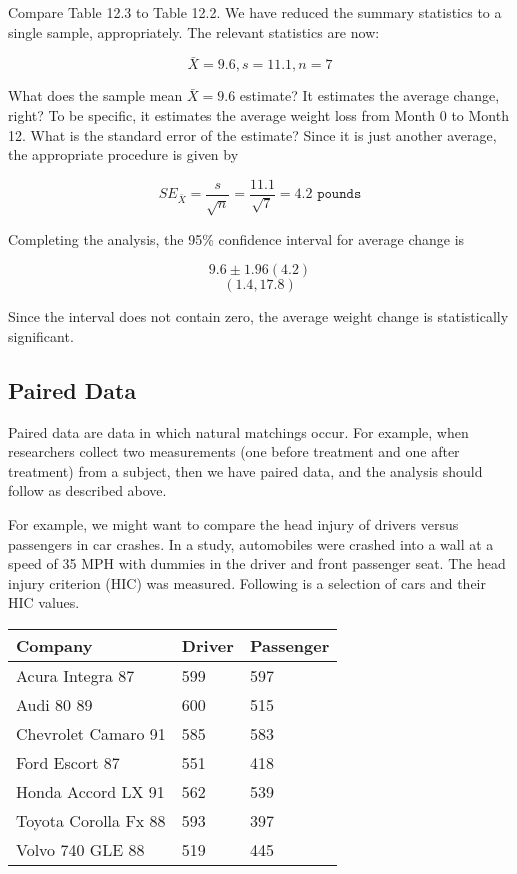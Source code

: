 \documentclass[11pt]{book}\usepackage[]{graphicx}\usepackage[]{color}
\begin{document}
Compare Table 12.3 to Table 12.2.  We have reduced the summary statistics to a single sample, appropriately.  The relevant statistics are now:

$$ \bar{X} = 9.6,  s = 11.1,  n= 7 $$

What does the sample mean $\bar{X} = 9.6$ estimate?  It estimates the average change, right?  To be specific, it estimates the average weight loss from Month 0 to Month 12.  What is the standard error of the estimate?  Since it is just another average, the appropriate procedure is given by 

\begin{equation*}
SE_{\bar{X}} = \frac{s}{\sqrt{n}} = \frac{11.1}{\sqrt{7}} = 4.2 \texttt{ pounds}
\end{equation*}

Completing the analysis, the 95\% confidence interval for average change is

\begin{equation*}
9.6 \pm 1.96 (4.2)
\end{equation*}
\begin{equation*}
(1.4, 17.8)
\end{equation*}

Since the interval does not contain zero, the average weight change is statistically significant.

\subsection{Paired Data}

Paired data are data in which natural matchings occur.  For example, when researchers collect two measurements (one before treatment and one after treatment) from a subject, then we have paired data, and the analysis should follow as described above.  

For example, we might want to compare the head injury of drivers versus passengers in car crashes.   In a study, automobiles were crashed into a wall at a speed of 35 MPH with dummies in the driver and front passenger seat. The head injury criterion (HIC) was measured.  Following is a selection of cars and their HIC values.

\begin{table}[ht]
\centering
\begin{tabular}{@{} lll @{}} \hline
Company & Driver & Passenger \\ \hline
Acura Integra 87        &     		599   &      597 \\
Audi 80 89              &    		600    &     515 \\
Chevrolet Camaro 91     &    		585    &     583 \\
Ford Escort 87          &     		551   &      418 \\
Honda Accord LX 91      &     	562     &    539 \\
Toyota Corolla Fx 88    &    		593     &    397 \\
Volvo 740 GLE 88        &      		519   &      445 \\ \hline
\end{tabular}
\end{table}
\end{document}
